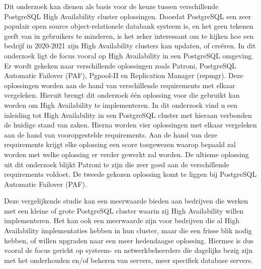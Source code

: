 Dit onderzoek kan dienen als basis voor de keuze tussen verschillende PostgreSQL High Availability cluster oplossingen. Doordat PostgreSQL een zeer populair open source object-relationele databank systeem is, en het geen tekenen geeft van in gebruikers te minderen, is het zeker interessant om te kijken hoe een bedrijf in 2020-2021 zijn High Availability clusters kan updaten, of creëren. In dit onderzoek ligt de focus vooral op High Availability in een PostgreSQL omgeving. Er wordt gekeken naar verschillende oplossingen zoals Patroni, PostgreSQL Automatic Failover (PAF), Pgpool-II en Replication Manager (repmgr). Deze oplossingen worden aan de hand van verschillende requirements met elkaar vergeleken. Hieruit brengt dit onderzoek één oplossing voor die gebruikt kan worden om High Availability te implementeren. In dit onderzoek vind u een inleiding tot High Availability in een PostgreSQL cluster met hieraan verbonden de huidige stand van zaken. Hierna worden vier oplossingen met elkaar vergeleken aan de hand van vooropgestelde requirements. Aan de hand van deze requirements krijgt elke oplossing een score toegewezen waarop bepaald zal worden met welke oplossing er verder gewerkt zal worden. De ultieme oplossing uit dit onderzoek blijkt Patroni te zijn die zeer goed aan de verschillende requirements voldoet. De tweede gekozen oplossing komt te liggen bij PostgreSQL Automatic Failover (PAF).

Deze vergelijkende studie kan een meerwaarde bieden aan bedrijven die werken met een kleine of grote PostgreSQL cluster waarin zij High Availability willen implementeren. Het kan ook een meerwaarde zijn voor bedrijven die al High Availability implementaties hebben in hun cluster, maar die een frisse blik nodig hebben, of willen upgraden naar een meer hedendaagse oplossing. Hiermee is dus vooral de focus gericht op systeem- en netwerkbeheerders die dagelijks bezig zijn met het onderhouden en/of beheren van servers, meer specifiek database servers.
